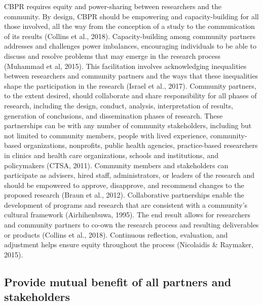 \documentclass[
  11pt,
]{book}
\begin{document}
CBPR requires equity and power-sharing between researchers and the community. By design, CBPR should be empowering and capacity-building for all those involved, all the way from the conception of a study to the communication of its results (Collins et al., 2018). Capacity-building among community partners addresses and challenges power imbalances, encouraging individuals to be able to discuss and resolve problems that may emerge in the research process (Muhammad et al, 2015). This facilitation involves acknowledging inequalities between researchers and community partners and the ways that these inequalities shape the participation in the research (Israel et al., 2017). Community partners, to the extent desired, should collaborate and share responsibility for all phases of research, including the design, conduct, analysis, interpretation of results, generation of conclusions, and dissemination phases of research. These partnerships can be with any number of community stakeholders, including but not limited to community members, people with lived experience, community-based organizations, nonprofits, public health agencies, practice-based researchers in clinics and health care organizations, schools and institutions, and policymakers (CTSA, 2011). Community members and stakeholders can participate as advisers, hired staff, administrators, or leaders of the research and should be empowered to approve, disapprove, and recommend changes to the proposed research (Braun et al., 2012). Collaborative partnerships enable the development of programs and research that are consistent with a community's cultural framework (Airhihenbuwa, 1995). The end result allows for researchers and community partners to co-own the research process and resulting deliverables or products (Collins et al., 2018). Continuous reflection, evaluation, and adjustment helps ensure equity throughout the process (Nicolaidis \& Raymaker, 2015).

\subsection{Provide mutual benefit of all partners and stakeholders}\label{provide-mutual-benefit-of-all-partners-and-stakeholders}
\end{document}
